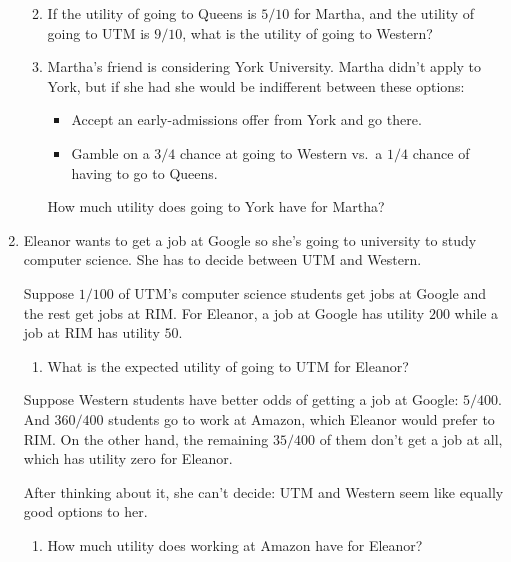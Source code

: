 \documentclass[justified]{tufte-book}
\providecommand{\tightlist}{%
  \setlength{\itemsep}{0pt}\setlength{\parskip}{0pt}}
\theoremstyle{definition}
\theoremstyle{definition}
\theoremstyle{definition}
\theoremstyle{remark}
\begin{document}
\begin{enumerate}
  \begin{enumerate}
  \def\labelenumii{\alph{enumii}.}
  \item
    If the utility of going to Queens is \(5/10\) for Martha, and the
    utility of going to UTM is \(9/10\), what is the utility of going to
    Western?
  \item
    Martha's friend is considering York University. Martha didn't apply
    to York, but if she had she would be indifferent between these
    options:

    \begin{itemize}
    \tightlist
    \item
      Accept an early-admissions offer from York and go there.
    \item
      Gamble on a \(3/4\) chance at going to Western vs.~a \(1/4\)
      chance of having to go to Queens.
    \end{itemize}

    How much utility does going to York have for Martha?
  \end{enumerate}
\item
  Eleanor wants to get a job at Google so she's going to university to
  study computer science. She has to decide between UTM and Western.

  Suppose \(1/100\) of UTM's computer science students get jobs at
  Google and the rest get jobs at RIM. For Eleanor, a job at Google has
  utility \(200\) while a job at RIM has utility \(50\).

  \begin{enumerate}
  \def\labelenumii{\alph{enumii}.}
  \tightlist
  \item
    What is the expected utility of going to UTM for Eleanor?
  \end{enumerate}

  Suppose Western students have better odds of getting a job at Google:
  \(5/400\). And \(360/400\) students go to work at Amazon, which
  Eleanor would prefer to RIM. On the other hand, the remaining
  \(35/400\) of them don't get a job at all, which has utility zero for
  Eleanor.

  After thinking about it, she can't decide: UTM and Western seem like
  equally good options to her.

  \begin{enumerate}
  \def\labelenumii{\alph{enumii}.}
  \setcounter{enumii}{1}
  \tightlist
  \item
    How much utility does working at Amazon have for Eleanor?
  \end{enumerate}


\end{enumerate}
\end{document}
